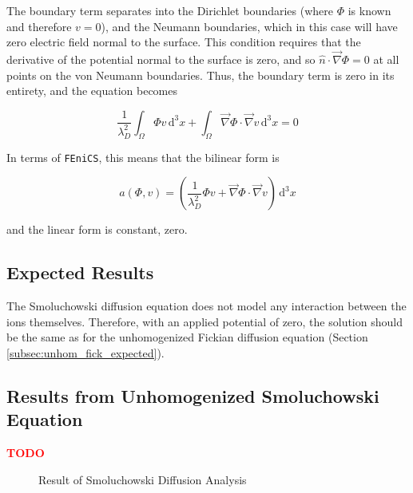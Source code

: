 The boundary term separates into the Dirichlet boundaries (where $\Phi$ is known and therefore $v=0$),
and the Neumann boundaries, which in this case will have zero electric field normal to the surface.
This condition requires that the derivative of the potential normal to the surface is zero,
and so $\hat{n} \cdot \vec{\nabla} \Phi = 0$ at all points on the von Neumann boundaries.
Thus, the boundary term is zero in its entirety, and the equation becomes

\begin{equation}
\frac{1}{\lambda_D^2} \int_{\Omega} \Phi v \,\mathrm{d}^3x
+ \int_{\Omega} \vec{\nabla}\Phi \cdot \vec{\nabla}v \,\mathrm{d}^3x
= 0
\end{equation}

In terms of \texttt{FEniCS}, this means that the bilinear form is

\begin{equation}
a(\Phi,v)=\left(\frac{1}{\lambda_D^2} \Phi v  + \vec{\nabla}\Phi \cdot \vec{\nabla}v \right) \,\mathrm{d}^3x
\end{equation}

and the linear form is constant, zero.

\subsection{Expected Results}\label{subsec:unhom_smol_expected}

The Smoluchowski diffusion equation does not model any interaction between the ions themselves.
Therefore, with an applied potential of zero,
the solution should be the same as for the
unhomogenized Fickian diffusion equation (Section \ref{subsec:unhom_fick_expected}).

\subsection{Results from Unhomogenized Smoluchowski Equation}\label{subsec:res_unhom_smol}

\textcolor{red}{\textbf{TODO}}

\begin{figure}[H]
\centering
{}
\caption{Result of Smoluchowski Diffusion Analysis}
\label{fig:uh_smol_D_vs_phi}
\end{figure}
